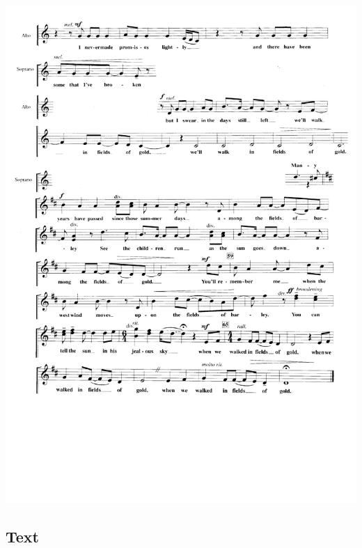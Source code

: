 \includegraphics[width=\textwidth]{resources/arrangements/Fields of Gold - Melody 02.png}


\subsection*{Text}

